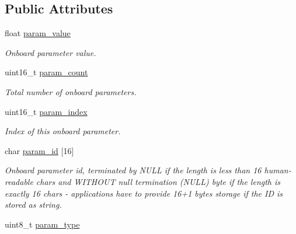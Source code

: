 \subsection*{Public Attributes}
\begin{DoxyCompactItemize}
\item 
\hypertarget{struct____mavlink__param__value__t_acd7d6401383f92dac17a95946b501a50}{float \hyperlink{struct____mavlink__param__value__t_acd7d6401383f92dac17a95946b501a50}{param\+\_\+value}}\label{struct____mavlink__param__value__t_acd7d6401383f92dac17a95946b501a50}

\begin{DoxyCompactList}\small\item\em Onboard parameter value. \end{DoxyCompactList}\item 
\hypertarget{struct____mavlink__param__value__t_ab53bec8370ac590fc761b9a9de49f6b6}{uint16\+\_\+t \hyperlink{struct____mavlink__param__value__t_ab53bec8370ac590fc761b9a9de49f6b6}{param\+\_\+count}}\label{struct____mavlink__param__value__t_ab53bec8370ac590fc761b9a9de49f6b6}

\begin{DoxyCompactList}\small\item\em Total number of onboard parameters. \end{DoxyCompactList}\item 
\hypertarget{struct____mavlink__param__value__t_a213d71adbd95b241f962dd1d375c3a5a}{uint16\+\_\+t \hyperlink{struct____mavlink__param__value__t_a213d71adbd95b241f962dd1d375c3a5a}{param\+\_\+index}}\label{struct____mavlink__param__value__t_a213d71adbd95b241f962dd1d375c3a5a}

\begin{DoxyCompactList}\small\item\em Index of this onboard parameter. \end{DoxyCompactList}\item 
\hypertarget{struct____mavlink__param__value__t_a601c9a44cc42ba2ab13d0778aa4b8d96}{char \hyperlink{struct____mavlink__param__value__t_a601c9a44cc42ba2ab13d0778aa4b8d96}{param\+\_\+id} \mbox{[}16\mbox{]}}\label{struct____mavlink__param__value__t_a601c9a44cc42ba2ab13d0778aa4b8d96}

\begin{DoxyCompactList}\small\item\em Onboard parameter id, terminated by N\+U\+L\+L if the length is less than 16 human-\/readable chars and W\+I\+T\+H\+O\+U\+T null termination (N\+U\+L\+L) byte if the length is exactly 16 chars -\/ applications have to provide 16+1 bytes storage if the I\+D is stored as string. \end{DoxyCompactList}\item 
\hypertarget{struct____mavlink__param__value__t_a825cfefbe7cfd71991186c4ffc897447}{uint8\+\_\+t \hyperlink{struct____mavlink__param__value__t_a825cfefbe7cfd71991186c4ffc897447}{param\+\_\+type}}\label{struct____mavlink__param__value__t_a825cfefbe7cfd71991186c4ffc897447}


\end{DoxyCompactItemize}
